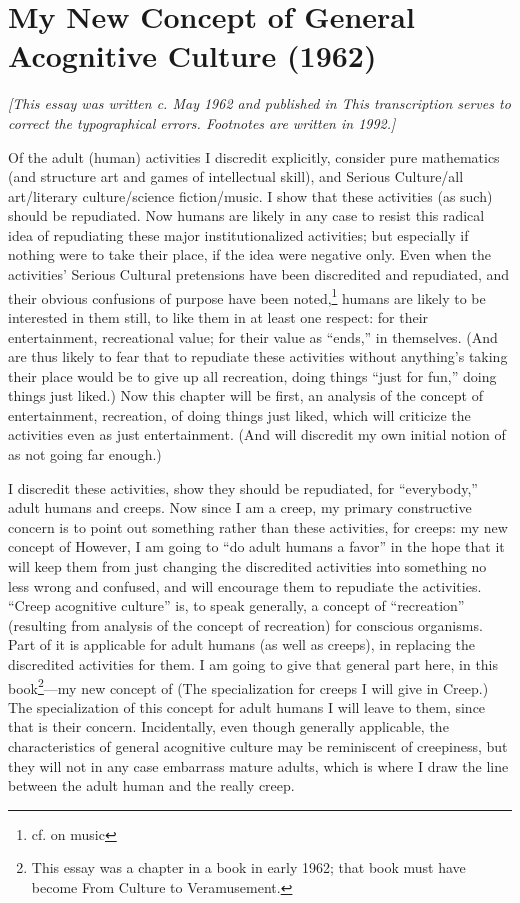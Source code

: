 \chapter{My New Concept of General Acognitive Culture (1962)}

{\itshape [This essay was written c. May 1962 and published in  This transcription serves to correct the typographical errors. Footnotes are written in 1992.]}

Of the adult (human) activities I discredit explicitly, consider pure mathematics (and structure art and games of intellectual skill), and Serious Culture\slash all art\slash literary culture\slash science fiction\slash music. I show that these activities (as such) should be repudiated. Now humans are likely in any case to resist this radical idea of repudiating these major institutionalized activities; but especially if nothing were to take their place, if the idea were negative only. Even when the activities' Serious Cultural pretensions have been discredited and repudiated, and their obvious confusions of purpose have been noted,\footnote{cf.  on music} humans are likely to be interested in them still, to like them in at least one respect: for their entertainment, recreational value; for their value as \enquote{ends,} in themselves. (And are thus likely to fear that to repudiate these activities without anything's taking their place would be to give up all recreation, doing things \enquote{just for fun,} doing things just liked.) Now this chapter will be first, an analysis of the concept of entertainment, recreation, of doing things just liked, which will criticize the activities even as just entertainment. (And will discredit my own initial notion of  as not going far enough.)

I discredit these activities, show they should be repudiated, for \enquote{everybody,} adult humans and creeps. Now since I am a creep, my primary constructive concern is to point out something rather than these activities, for creeps: my new concept of  However, I am going to \enquote{do adult humans a favor} in the hope that it will keep them from just changing the discredited activities into something no less wrong and confused, and will encourage them to repudiate the activities. \enquote{Creep acognitive culture} is, to speak generally, a concept of \enquote{recreation} (resulting from analysis of the concept of recreation) for conscious organisms. Part of it is applicable for adult humans (as well as creeps), in replacing the discredited activities for them. I am going to give that general part here, in this book\footnote{This essay was a chapter in a book in early 1962; that book must have become From Culture to Veramusement.}---my new concept of  (The specialization for creeps I will give in Creep.) The specialization of this concept for adult humans I will leave to them, since that is their concern. Incidentally, even though generally applicable, the characteristics of general acognitive culture may be reminiscent of creepiness, but they will not in any case embarrass mature adults, which is where I draw the line between the adult human and the really creep.

